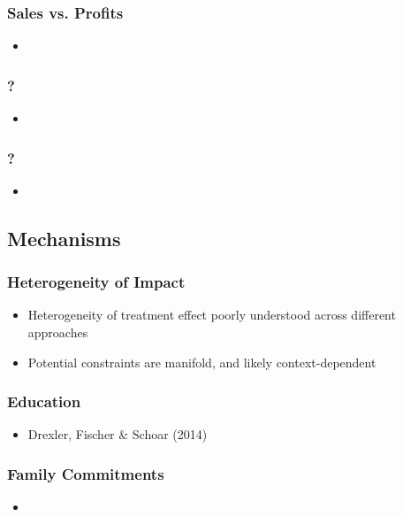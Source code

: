 \documentclass[hideothersubsections, usenames,dvipsnames,10pt]{beamer}
\begin{document}
\begin{frame}
\frametitle{Sales vs. Profits}
	\begin{itemize}
	\item 
	\vspace{0.1in}
	\end{itemize}
\end{frame}


\begin{frame}
\frametitle{?}
	\begin{itemize}
	\item 
	\vspace{0.1in}
	\end{itemize}
\end{frame}

\begin{frame}
\frametitle{?}
	\begin{itemize}
	\item 
	\vspace{0.1in}
	\end{itemize}
\end{frame}


\subsection{Mechanisms}

\begin{frame}
\frametitle{Heterogeneity of Impact}
	\begin{itemize}
	\item Heterogeneity of treatment effect poorly understood across different approaches
	\item Potential constraints are manifold, and likely context-dependent
	\vspace{0.1in}
	\end{itemize}
\end{frame}

\begin{frame}
\frametitle{Education}
	\begin{itemize}
	\item Drexler, Fischer \& Schoar (2014)
	\vspace{0.1in}
	\end{itemize}
\end{frame}

\begin{frame}
\frametitle{Family Commitments}
	\begin{itemize}
	\item 
	\vspace{0.1in}
	\end{itemize}
\end{frame}
\end{document}

